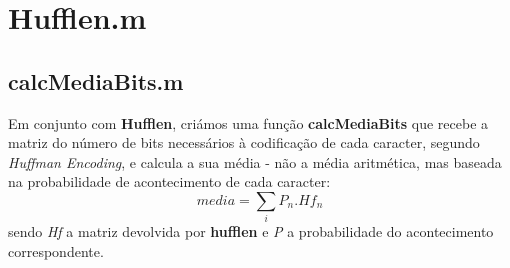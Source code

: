 \documentclass{article}
\begin{document}
\begin{comment}
Em análise, mediante os nossos conhecimentos, concordamos com os resultados obtidos.\\No homerBin.bmp estes resultados demostram uma predominância exclusiva da cor preta (0) e branca (255), como realmente acontece.\\No homer.bmp consegue-se verificar a dominância da cor preta, mas também se notam ligeiras ocorrências de cores próximas, ora do preto ora do branco, o que nos leva a perceber que na imagem predomina o preto e cores cinzentas claras ou escuras.\\Já o kid.bmp tem uma distribuição mais variada, logo supõe-se haver um maior número de tons acinzentados e pretos, não totalmente escuros.\\Quanto ao ficheiro de texto, cujo código ASCII correspondente a cada caracter está representado no eixo dos XX do gráfico, podemos verificar um menor número de ocorrências nos primeiros indices - ou seja nas letras minúsculas, como seria expectável.\\\\A entropia, segundo vemos pelos gráficos, irá ser maior no guitarSolo.bmp, visto ser o que apresenta um maior grau de ocorrências diferentes. Em sentido inverso, entende-se que a entropia vai ser menor no homerBin.bmp, pois só apresenta dois tons - quanto menor for a incerteza, menor será a entropia.\\\\
\textbf{Respota à pergunta:}\\
\end{comment}

\section{Hufflen.m}

\subsection{calcMediaBits.m}
Em conjunto com \textbf{Hufflen}, criámos uma função \textbf{calcMediaBits} que recebe a matriz do número de bits necessários à codificação de cada caracter, segundo \textit{Huffman Encoding}, e calcula a sua média - não a média aritmética, mas baseada na probabilidade de acontecimento de cada caracter:
\[
	media = \sum_i P_n . Hf_n
\]
 sendo \textit{Hf} a matriz devolvida por \textbf{hufflen} e \textit{P} a probabilidade do acontecimento correspondente.
\end{document}
